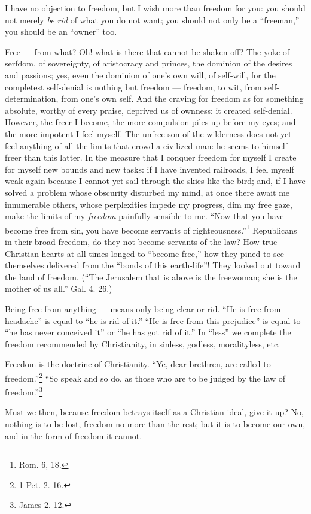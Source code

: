I have no objection to freedom, but I wish more than freedom for you: you 
should not merely \textit{be rid} of what you do not want; you should not only 
be a ``freeman,'' you should be an ``owner'' too.

Free --- from what? Oh! what is there that cannot be shaken off? The yoke of 
serfdom, of sovereignty, of aristocracy and princes, the dominion of the 
desires and passions; yes, even the dominion of one's own will, of self-will, 
for the completest self-denial is nothing but freedom --- freedom, to wit, from 
self-determination, from one's own self. And the craving for freedom as for 
something absolute, worthy of every praise, deprived us of ownness: it created 
self-denial. However, the freer I become, the more compulsion piles up before 
my eyes; and the more impotent I feel myself. The unfree son of the wilderness 
does not yet feel anything of all the limits that crowd a civilized man: he 
seems to himself freer than this latter. In the measure that I conquer freedom 
for myself I create for myself new bounds and new tasks: if I have invented 
railroads, I feel myself weak again because I cannot yet sail through the 
skies like the bird; and, if I have solved a problem whose obscurity disturbed 
my mind, at once there await me innumerable others, whose perplexities impede 
my progress, dim my free gaze, make the limits of my \textit{freedom} 
painfully sensible to me. ``Now that you have become free from sin, you have 
become servants of righteousness.''\footnote{Rom. 6, 18.} Republicans in 
their broad freedom, do they not become servants of the law? How true 
Christian hearts at all times longed to ``become free,'' how they pined to 
see themselves delivered from the ``bonds of this earth-life''! They looked 
out toward the land of freedom. (``The Jerusalem that is above is the 
freewoman; she is the mother of us all.'' Gal. 4. 26.)

Being free from anything --- means only being clear or rid. ``He is free from 
headache'' is equal to ``he is rid of it.'' ``He is free from this 
prejudice'' is equal to ``he has never conceived it'' or ``he has got rid 
of it.'' In ``less'' we complete the freedom recommended by Christianity, 
in sinless, godless, moralityless, etc.

 Freedom is the doctrine of Christianity. ``Ye, dear brethren, are called to 
freedom.''\footnote{1 Pet. 2. 16.} ``So speak and so do, as those who are to 
be judged by the law of freedom.''\footnote{James 2. 12.}

Must we then, because freedom betrays itself as a Christian ideal, give it up? 
No, nothing is to be lost, freedom no more than the rest; but it is to become 
our own, and in the form of freedom it cannot.

